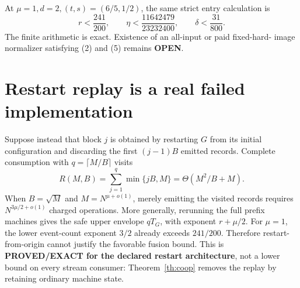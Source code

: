 \documentclass[11pt]{article}
\newcommand{\OPEN}{\textbf{OPEN}}
\begin{document}
At $\mu=1,d=2,(t,s)=(6/5,1/2)$, the same strict entry calculation is
\[
r<\frac{241}{200},\qquad
\eta<\frac{11642479}{23232400},\qquad
\delta<\frac{31}{800}.                                    \tag{5}
\]
The finite arithmetic is exact.  Existence of an all-input or paid fixed-hard-
image normalizer satisfying (2) and (5) remains \OPEN.

\section{Restart replay is a real failed implementation}
Suppose instead that block $j$ is obtained by restarting $G$ from its initial
configuration and discarding the first $(j-1)B$ emitted records.  Complete
consumption with $q=\lceil M/B\rceil$ visits
\[
R(M,B)=\sum_{j=1}^{q}\min\{jB,M\}=\Theta(M^2/B+M).          \tag{6}
\]
When $B=\sqrt M$ and $M=N^{\mu+o(1)}$, merely emitting the visited records
requires $N^{3\mu/2+o(1)}$ charged operations.  More generally, rerunning the
full prefix machines gives the safe upper envelope $qT_G$, with exponent
$r+\mu/2$.  For $\mu=1$, the lower event-count exponent $3/2$ already exceeds
$241/200$.  Therefore restart-from-origin cannot justify the favorable fusion
bound.  This is \textbf{PROVED/EXACT for the declared restart architecture},
not a lower bound on every stream consumer: Theorem~\ref{th:coop} removes the
replay by retaining ordinary machine state.
\end{document}
